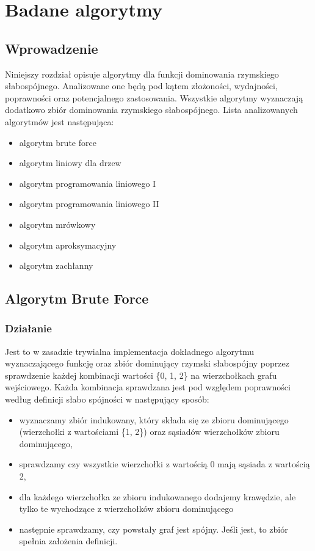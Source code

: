 \chapter{Badane algorytmy}

\section{Wprowadzenie}
Niniejszy rozdział opisuje algorytmy dla funkcji dominowania rzymskiego słabospójnego. Analizowane one będą pod kątem złożoności, wydajności, poprawności oraz potencjalnego zastosowania. Wszystkie algorytmy wyznaczają dodatkowo zbiór dominowania rzymskiego słabospójnego. Lista analizowanych algorytmów jest następująca:

\begin{itemize}
    \item algorytm brute force
    \item algorytm liniowy dla drzew
    \item algorytm programowania liniowego I
    \item algorytm programowania liniowego II
    \item algorytm mrówkowy
    \item algorytm aproksymacyjny
    \item algorytm zachłanny
\end{itemize}

\section{Algorytm Brute Force}

\subsection{Działanie}
Jest to w zasadzie trywialna implementacja dokładnego algorytmu wyznaczającego funkcję oraz zbiór dominujący rzymski słabospójny poprzez sprawdzenie każdej kombinacji wartości \{0, 1, 2\} na wierzchołkach grafu wejściowego. Każda kombinacja sprawdzana jest pod względem poprawności według definicji słabo spójności w następujący sposób:
\begin{itemize}
    \item wyznaczamy zbiór indukowany, który składa się ze zbioru dominującego (wierzchołki z wartościami \{1, 2\}) oraz sąsiadów wierzchołków zbioru dominującego,
    \item sprawdzamy czy wszystkie wierzchołki z wartością 0 mają sąsiada z wartością 2,
    \item dla każdego wierzchołka ze zbioru indukowanego dodajemy krawędzie, ale tylko te wychodzące z wierzchołków zbioru dominującego
    \item następnie sprawdzamy, czy powstały graf jest spójny. Jeśli jest, to zbiór spełnia założenia definicji.
\end{itemize}

